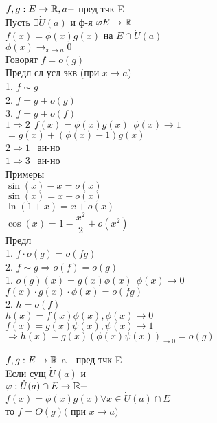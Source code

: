
$ f,g : E \rightarrow \mathbb{R}, a - $ пред тчк E \\
Пусть $ \exists \dot{U} (a) $ и ф-я $ \varphi E \rightarrow \mathbb{R} $ \\
$ f(x) = \phi(x) g(x) $ на $ E \cap \dot{U} (a) $ \\
$ \phi(x) \rightarrow_{x \rightarrow a} 0 $ \\
Говорят $ f = o(g) $\\
Предл сл усл экв (при $ x \rightarrow a $) \\
1. $ f \sim g $ \\
2. $ f = g + o(g) $\\
3. $ f = g + o(f) $\\
$1 \Rightarrow 2 \ \ f(x)= \phi(x) g(x) \ \ \phi(x) \rightarrow 1 $ \\
$ = g(x) + (\phi(x) - 1)g(x) $ \\
$ 2 \Rightarrow 1 \ \ $ ан-но \\
$ 1 \Rightarrow 3 \ \ $ ан-но \\
Примеры \\
$ \sin(x) - x = o(x) $\\
$ \sin(x) = x + o(x) $ \\
$ \ln(1+x) = x + o(x) $ \\
$ \cos(x) = 1 - \dfrac{x^2}{2} + o(x^2) $ \\
Предл \\
1. $ f \cdot o(g) = o(fg) $ \\
2. $ f \sim g  \Rightarrow o(f) = o(g) $ \\
1. $ o(g) (x) = g(x) \phi(x) \ \ \phi(x) \rightarrow 0 $ \\
$ f(x) \cdot g(x) \cdot \phi(x) = o(fg) $\\
2. $ h= o(f) $ \\
$ h(x) = f(x) \phi(x), \phi(x) \rightarrow 0 $ \\
$ f(x) = g(x) \psi (x), \psi(x) \rightarrow 1 $ \\
$ \Rightarrow h(x) = g(x) (\phi(x) \psi(x))_{\rightarrow 0} = o(g) $

\begin{definition}
	$ f, g : E \rightarrow \mathbb{R} $ a - пред тчк E \\
	Eсли сущ $ \dot{U} (a) $ и \\
	$ \varphi : \dot{U} (a) \cap E \rightarrow \mathbb{R}+ $ \\
	$ f(x) = \phi(x) g(x) \forall x \in \dot{U} (a) \cap E $ \\
	то $ f = O(g) ( $ при $  x \rightarrow a) $ \\
\end{definition}




